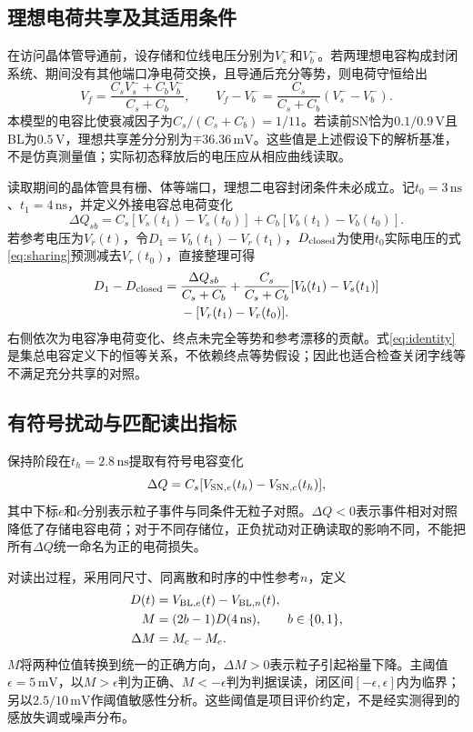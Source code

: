 \documentclass[UTF8,a4paper,zihao=-4,fontset=fandol]{ctexart}
\newcommand{\ns}{\,\mathrm{ns}}
\newcommand{\mV}{\,\mathrm{mV}}
\newcommand{\V}{\,\mathrm{V}}
\begin{document}
\subsection{理想电荷共享及其适用条件}
在访问晶体管导通前，设存储和位线电压分别为$V_s^-$和$V_b^-$。若两理想电容构成封闭系统、期间没有其他端口净电荷交换，且导通后充分等势，则电荷守恒给出\cite{keeth2001}
\begin{equation}
V_f=\frac{C_sV_s^-+C_bV_b^-}{C_s+C_b},\qquad
V_f-V_b^-=\frac{C_s}{C_s+C_b}(V_s^--V_b^-).
\label{eq:sharing}
\end{equation}
本模型的电容比使衰减因子为$C_s/(C_s+C_b)=1/11$。若读前SN恰为$0.1/0.9\V$且BL为$0.5\V$，理想共享差分分别为$\mp36.36\mV$。这些值是上述假设下的解析基准，不是仿真测量值；实际初态释放后的电压应从相应曲线读取。

读取期间的晶体管具有栅、体等端口，理想二电容封闭条件未必成立。记$t_0=3\ns$、$t_1=4\ns$，并定义外接电容总电荷变化
\begin{equation}
\Delta Q_{sb}=C_s[V_s(t_1)-V_s(t_0)]+C_b[V_b(t_1)-V_b(t_0)].
\end{equation}
若参考电压为$V_r(t)$，令$D_1=V_b(t_1)-V_r(t_1)$，$D_{\rm closed}$为使用$t_0$实际电压的式\eqref{eq:sharing}预测减去$V_r(t_0)$，直接整理可得
\begin{equation}
\begin{split}
D_1-D_{\rm closed}={}&\frac{\Delta Q_{sb}}{C_s+C_b}
+\frac{C_s}{C_s+C_b}[V_b(t_1)-V_s(t_1)]\\
&-[V_r(t_1)-V_r(t_0)].
\end{split}
\label{eq:identity}
\end{equation}
右侧依次为电容净电荷变化、终点未完全等势和参考漂移的贡献。式\eqref{eq:identity}是集总电容定义下的恒等关系，不依赖终点等势假设；因此也适合检查关闭字线等不满足充分共享的对照。

\subsection{有符号扰动与匹配读出指标}
保持阶段在$t_h=2.8\ns$提取有符号电容变化
\begin{equation}
\Delta Q=C_s[V_{{\rm SN},e}(t_h)-V_{{\rm SN},c}(t_h)],
\label{eq:dq}
\end{equation}
其中下标$e$和$c$分别表示粒子事件与同条件无粒子对照。$\Delta Q<0$表示事件相对对照降低了存储电容电荷；对于不同存储位，正负扰动对正确读取的影响不同，不能把所有$\Delta Q$统一命名为正的电荷损失。

对读出过程，采用同尺寸、同离散和时序的中性参考$n$，定义
\begin{align}
D(t)&=V_{{\rm BL},e}(t)-V_{{\rm BL},n}(t),\\
M&=(2b-1)D(4\ns),\qquad b\in\{0,1\},\label{eq:margin}\\
\Delta M&=M_c-M_e.\label{eq:loss}
\end{align}
$M$将两种位值转换到统一的正确方向，$\Delta M>0$表示粒子引起裕量下降。主阈值$\epsilon=5\mV$，以$M>\epsilon$判为正确、$M<-\epsilon$判为判据误读，闭区间$[-\epsilon,\epsilon]$内为临界；另以$2.5/10\mV$作阈值敏感性分析\cite{v3design}。这些阈值是项目评价约定，不是经实测得到的感放失调或噪声分布。
\end{document}
